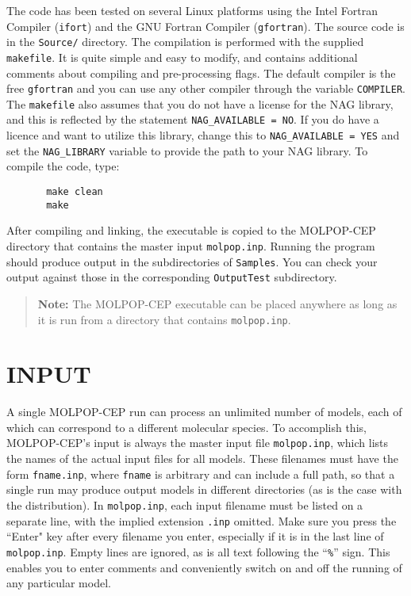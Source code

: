 \documentclass[12pt]{article}
\begin{document}
The code has been tested on several Linux platforms using the Intel Fortran
Compiler (\texttt{ifort}) and the GNU Fortran Compiler (\texttt{gfortran}). The
source code is in the \texttt{Source/} directory. The compilation is performed
with the supplied \texttt{makefile}. It is quite simple and easy to modify, and
contains additional comments about compiling and pre-processing flags. The
default compiler is the free \texttt{gfortran} and you can use any other
compiler through the variable \texttt{COMPILER}. The \texttt{makefile} also
assumes that you do not have a license for the NAG library, and this is
reflected by the statement \texttt{NAG\_AVAILABLE = NO}. If you do have a licence
and want to utilize this library, change this to \texttt{NAG\_AVAILABLE = YES}
and set the \texttt{NAG\_LIBRARY} variable to provide the path to your NAG
library. To compile the code, type:
\begin{verbatim}
       make clean
       make
\end{verbatim}
After compiling and linking, the executable is copied to the MOLPOP-CEP
directory that contains the master input \texttt{molpop.inp}. Running the
program should produce output in the subdirectories of {\tt Samples}. You can
check your output against those in the corresponding {\tt OutputTest}
subdirectory.

\begin{quote}
{\bf Note:} The MOLPOP-CEP executable can be placed anywhere as long as it is
run from a directory that contains \texttt{molpop.inp}.
\end{quote}


\section{INPUT}


A single MOLPOP-CEP run can process an unlimited number of models, each of which
can correspond to a different molecular species. To accomplish this, MOLPOP-CEP's
input is always the master input file \texttt{molpop.inp}, which lists the names of the
actual input files for all models. These filenames must have the form
\texttt{fname.inp}, where \texttt{fname} is arbitrary and can include a full path, so that a
single run may produce output models in different directories (as is the case
with the distribution). In \texttt{molpop.inp}, each input filename must be listed on a
separate line, with the implied extension \texttt{.inp} omitted. Make sure you press the
``Enter" key after every filename you enter, especially if it is in the last
line of \texttt{molpop.inp}. Empty lines are ignored, as is all text following the ``\texttt{\%}''
sign. This enables you to enter comments and conveniently switch on
and off the running of any particular model.
\end{document}
